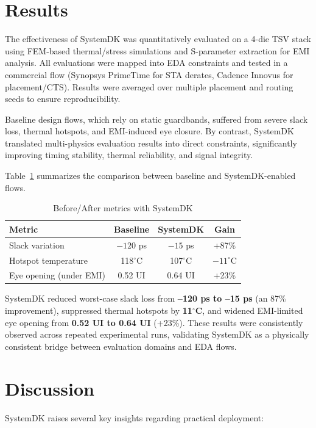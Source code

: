 \documentclass[conference]{IEEEtran}
\begin{document}
\section{Results}
The effectiveness of SystemDK was quantitatively evaluated on a 4-die TSV stack
using FEM-based thermal/stress simulations and S-parameter extraction for EMI analysis.
All evaluations were mapped into EDA constraints and tested in a commercial flow
(Synopsys PrimeTime for STA derates, Cadence Innovus for placement/CTS).
Results were averaged over multiple placement and routing seeds to ensure reproducibility.

Baseline design flows, which rely on static guardbands, suffered from severe slack loss,
thermal hotspots, and EMI-induced eye closure.
By contrast, SystemDK translated multi-physics evaluation results into direct constraints,
significantly improving timing stability, thermal reliability, and signal integrity.

Table~\ref{tab:results} summarizes the comparison between baseline and SystemDK-enabled flows.

\begin{table}[htbp]
\centering
\caption{Before/After metrics with SystemDK}
\label{tab:results}
\setlength{\tabcolsep}{6pt}
\renewcommand{\arraystretch}{1.25}
\footnotesize
\begin{tabular}{|l|c|c|c|}
\hline
\textbf{Metric} & \textbf{Baseline} & \textbf{SystemDK} & \textbf{Gain} \\
\hline
Slack variation & $-120$ ps & $-15$ ps & +87\% \\
Hotspot temperature & 118$^\circ$C & 107$^\circ$C & $-11^\circ$C \\
Eye opening (under EMI) & 0.52 UI & 0.64 UI & +23\% \\
\hline
\end{tabular}
\end{table}

SystemDK reduced worst-case slack loss from \textbf{--120 ps to --15 ps} (an 87\% improvement),
suppressed thermal hotspots by \textbf{11$^\circ$C}, and widened EMI-limited eye opening
from \textbf{0.52 UI to 0.64 UI} (+23\%).
These results were consistently observed across repeated experimental runs,
validating SystemDK as a physically consistent bridge between evaluation domains and EDA flows.

\section{Discussion}
SystemDK raises several key insights regarding practical deployment:
\end{document}
